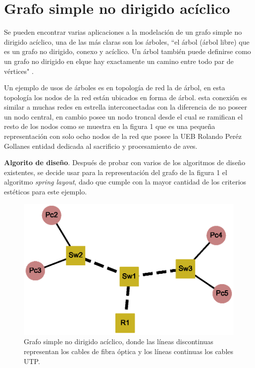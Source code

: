 \documentclass{article}
\begin{document}
\section{ Grafo simple no dirigido acíclico}
Se pueden encontrar varias aplicaciones a la modelación de un grafo simple no dirigido acíclico, una de las más claras son los árboles, “el árbol (árbol libre) que es un grafo no dirigido, conexo y acíclico. Un árbol también puede definirse como un grafo no dirigido en elque hay exactamente un camino entre todo par de vértices" \cite{gf1}. 

Un ejemplo de usos de árboles es en topología de red la de árbol, en esta topología los nodos de la red están ubicados en forma de árbol. esta conexión es similar a muchas redes en estrella interconectadas con la diferencia de no poseer un nodo central, en cambio posee un nodo troncal desde el cual se ramifican el resto de los nodos como se muestra en la figura 1 que es una pequeña representación con solo ocho nodos de la red que posee la UEB Rolando Peréz Gollanes entidad dedicada al sacrificio y procesamiento de aves. 

\textbf{Algorito de diseño}.
Después de probar con varios de los algoritmos de diseño existentes, se decide usar para la representación del grafo de la figura 1 el algoritmo \textit{spring layout}, dado que cumple con la mayor cantidad de los criterios estéticos para este ejemplo.

 
 
\begin{center}

\end{center}
\begin{figure}[ht]
\begin{center}
\includegraphics[scale=0.7]{Graf1_spring_layout.eps}
\caption{Grafo simple no dirigido acíclico, donde las líneas discontinuas representan los cables de fibra óptica y los líneas continuas los cables UTP.}
\end{center}
\end{figure}
\end{document}
